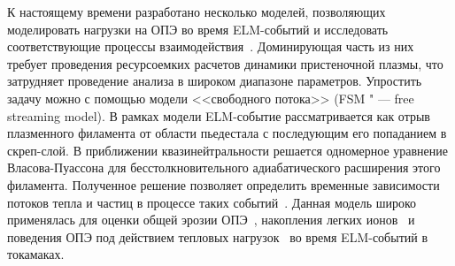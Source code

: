 К настоящему времени разработано несколько моделей, позволяющих моделировать нагрузки на ОПЭ во время ELM-событий и исследовать соответствующие процессы взаимодействия~\cite{Krieger2025,Leonard2014,zohm1996edge}. Доминирующая часть из них требует проведения ресурсоемких расчетов динамики пристеночной плазмы, что затрудняет проведение анализа в широком диапазоне параметров. Упростить задачу можно с помощью модели <<свободного потока>> (FSM " --- free streaming model). В рамках модели ELM-событие рассматривается как отрыв плазменного филамента от области пьедестала с последующим его попаданием в скреп-слой. В приближении квазинейтральности решается одномерное уравнение Власова-Пуассона для бесстолкновительного адиабатического расширения этого филамента. Полученное решение позволяет определить временные зависимости потоков тепла и частиц в процессе таких событий~\cite{Fundamenski2006, Moulton2013}. Данная модель широко применялась для оценки общей эрозии ОПЭ~\cite{Abrams2018, Wang2024}, накопления легких ионов~\cite{Dasgupta2023} и поведения ОПЭ под действием тепловых нагрузок~\cite{VandenKerkhof2021} во время ELM-событий в токамаках.

